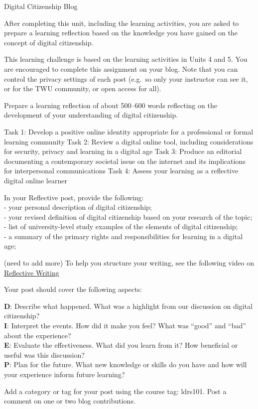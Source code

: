 \documentclass[
]{book}
\theoremstyle{definition}
\theoremstyle{definition}
\theoremstyle{definition}
\theoremstyle{definition}
\theoremstyle{remark}
\begin{document}
\begin{assessment}
{Digital Citizenship Blog}

After completing this unit, including the learning activities, you are asked to prepare a learning reflection based on the knowledge you have gained on the concept of digital citizenship.

This learning challenge is based on the learning activities in Units 4 and 5. You are encouraged to complete this assignment on your blog. Note that you can control the privacy settings of each post (e.g.~so only your instructor can see it, or for the TWU community, or open access for all).

Prepare a learning reflection of about 500--600 words reflecting on the development of your understanding of digital citizenship.

Task 1: Develop a positive online identity appropriate for a professional or formal learning community
Task 2: Review a digital online tool, including considerations for security, privacy and learning in a digital age
Task 3: Produce an editorial documenting a contemporary societal issue on the internet and its implications for interpersonal communications
Task 4: Assess your learning as a reflective digital online learner

In your Reflective post, provide the following:\\
- your personal description of digital citizenship;\\
- your revised definition of digital citizenship based on your research of the topic;\\
- list of university-level study examples of the elements of digital citizenship;\\
- a summary of the primary rights and responsibilities for learning in a digital age;

(need to add more)
To help you structure your writing, see the following video on \href{https://www.youtube.com/watch?v=SntBj0FIApw}{Reflective Writing}

Your post should cover the following aspects:

\textbf{D}: Describe what happened. What was a highlight from our discussion on digital citizenship?\\
\textbf{I}: Interpret the events. How did it make you feel? What was ``good'' and ``bad'' about the experience?\\
\textbf{E}: Evaluate the effectiveness. What did you learn from it? How beneficial or useful was this discussion?\\
\textbf{P}: Plan for the future. What new knowledge or skills do you have and how will your experience inform future learning?

Add a category or tag for your post using the course tag: ldrs101. Post a comment on one or two blog contributions.
\end{assessment}
\end{document}
